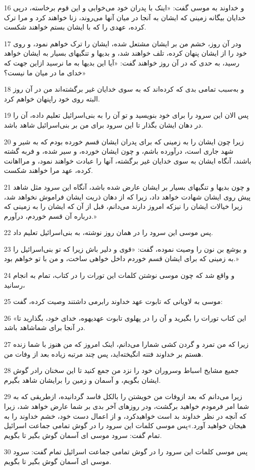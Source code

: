 \par 16 و خداوند به موسی گفت: «اینک با پدران خود می‌خوابی و این قوم برخاسته، در‌پی خدایان بیگانه زمینی که ایشان به آنجا در میان آنها می‌روند، زنا خواهند کرد و مرا ترک کرده، عهدی را که با ایشان بستم خواهند شکست.
\par 17 ودر آن روز، خشم من بر ایشان مشتعل شده، ایشان را ترک خواهم نمود، و روی خود را از ایشان پنهان کرده، تلف خواهند شد، و بدیها و تنگیهای بسیار به ایشان خواهد رسید، به حدی که در آن روز خواهند گفت: «آیا این بدیها به ما نرسید ازاین جهت که خدای ما در میان ما نیست؟»
\par 18 و به‌سبب تمامی بدی که کرده‌اند که به سوی خدایان غیر برگشته‌اند من در آن روز البته روی خود راپنهان خواهم کرد.
\par 19 پس الان این سرود را برای خود بنویسید و تو آن را به بنی‌اسرائیل تعلیم داده، آن را در دهان ایشان بگذار تا این سرود برای من بر بنی‌اسرائیل شاهد باشد.
\par 20 زیرا چون ایشان را به زمینی که برای پدران ایشان قسم خورده بودم که به شیر و شهد جاری است، درآورده باشم، و چون ایشان خورده، و سیر شده، و فربه گشته باشند، آنگاه ایشان به سوی خدایان غیر برگشته، آنها را عبادت خواهند نمود، و مرااهانت کرده، عهد مرا خواهند شکست. 
\par 21 و چون بدیها و تنگیهای بسیار بر ایشان عارض شده باشد، آنگاه این سرود مثل شاهد پیش روی ایشان شهادت خواهد داد، زیرا که از دهان ذریت ایشان فراموش نخواهد شد، زیرا خیالات ایشان را نیزکه امروز دارند می‌دانم، قبل از آن که ایشان را به زمینی که درباره آن قسم خوردم، درآورم.»
\par 22 پس موسی این سرود را در همان روز نوشته، به بنی‌اسرائیل تعلیم داد.
\par 23 و یوشع بن نون را وصیت نموده، گفت: «قوی و دلیر باش زیرا که تو بنی‌اسرائیل را به زمینی که برای ایشان قسم خوردم داخل خواهی ساخت، و من با تو خواهم بود.»
\par 24 و واقع شد که چون موسی نوشتن کلمات این تورات را در کتاب، تمام به انجام رسانید،
\par 25 موسی به لاویانی که تابوت عهد خداوند رابرمی داشتند وصیت کرده، گفت:
\par 26 «این کتاب تورات را بگیرید و آن را در پهلوی تابوت عهدیهوه، خدای خود، بگذارید تا در آنجا برای شماشاهد باشد.
\par 27 زیرا که من تمرد و گردن کشی شمارا می‌دانم، اینک امروز که من هنوز با شما زنده هستم بر خداوند فتنه انگیخته‌اید، پس چند مرتبه زیاده بعد از وفات من.
\par 28 جمیع مشایخ اسباط وسروران خود را نزد من جمع کنید تا این سخنان رادر گوش ایشان بگویم، و آسمان و زمین را برایشان شاهد بگیرم.
\par 29 زیرا می‌دانم که بعد ازوفات من خویشتن را بالکل فاسد گردانیده، ازطریقی که به شما امر فرمودم خواهید برگشت، ودر روزهای آخر بدی بر شما عارض خواهد شد، زیرا که آنچه در نظر خداوند بد است خواهیدکرد، و از اعمال دست خود، خشم خداوند را به هیجان خواهید آورد.»پس موسی کلمات این سرود را در گوش تمامی جماعت اسرائیل تمام گفت: سرود موسی ای آسمان گوش بگیر تا بگویم.
\par 30 پس موسی کلمات این سرود را در گوش تمامی جماعت اسرائیل تمام گفت: سرود موسی ای آسمان گوش بگیر تا بگویم.
 
